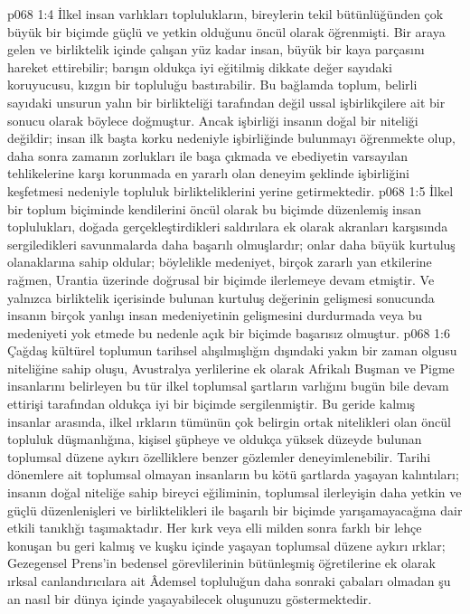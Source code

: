\vs p068 1:4 İlkel insan varlıkları toplulukların, bireylerin tekil bütünlüğünden çok büyük bir biçimde güçlü ve yetkin olduğunu öncül olarak öğrenmişti. Bir araya gelen ve birliktelik içinde çalışan yüz kadar insan, büyük bir kaya parçasını hareket ettirebilir; barışın oldukça iyi eğitilmiş dikkate değer sayıdaki koruyucusu, kızgın bir topluluğu bastırabilir. Bu bağlamda toplum, belirli sayıdaki unsurun yalın bir birlikteliği tarafından değil ussal işbirlikçilere ait  bir sonucu olarak böylece doğmuştur. Ancak işbirliği insanın doğal bir niteliği değildir; insan ilk başta korku nedeniyle işbirliğinde bulunmayı öğrenmekte olup, daha sonra zamanın zorlukları ile başa çıkmada ve ebediyetin varsayılan tehlikelerine karşı korunmada en yararlı olan deneyim şeklinde işbirliğini keşfetmesi nedeniyle topluluk birlikteliklerini yerine getirmektedir.
\vs p068 1:5 İlkel bir toplum biçiminde kendilerini öncül olarak bu biçimde düzenlemiş insan toplulukları, doğada gerçekleştirdikleri saldırılara ek olarak akranları karşısında sergiledikleri savunmalarda daha başarılı olmuşlardır; onlar daha büyük kurtuluş olanaklarına sahip oldular; böylelikle medeniyet, birçok zararlı yan etkilerine rağmen, Urantia üzerinde doğrusal bir biçimde ilerlemeye devam etmiştir. Ve yalnızca birliktelik içerisinde bulunan kurtuluş değerinin gelişmesi sonucunda insanın birçok yanlışı insan medeniyetinin gelişmesini durdurmada veya bu medeniyeti yok etmede bu nedenle açık bir biçimde başarısız olmuştur.
\vs p068 1:6 Çağdaş kültürel toplumun tarihsel alışılmışlığın dışındaki yakın bir zaman olgusu niteliğine sahip oluşu, Avustralya yerlilerine ek olarak Afrikalı Buşman ve Pigme insanlarını belirleyen bu tür ilkel toplumsal şartların varlığını bugün bile devam ettirişi tarafından oldukça iyi bir biçimde sergilenmiştir. Bu geride kalmış insanlar arasında, ilkel ırkların tümünün çok belirgin ortak nitelikleri olan öncül topluluk düşmanlığına, kişisel şüpheye ve oldukça yüksek düzeyde bulunan toplumsal düzene aykırı özelliklere benzer gözlemler deneyimlenebilir. Tarihi dönemlere ait toplumsal olmayan insanların bu kötü şartlarda yaşayan kalıntıları; insanın doğal niteliğe sahip bireyci eğiliminin, toplumsal ilerleyişin daha yetkin ve güçlü düzenlenişleri ve birliktelikleri ile başarılı bir biçimde yarışamayacağına dair etkili tanıklığı taşımaktadır. Her kırk veya elli milden sonra farklı bir lehçe konuşan bu geri kalmış ve kuşku içinde yaşayan toplumsal düzene aykırı ırklar; Gezegensel Prens’in bedensel görevlilerinin bütünleşmiş öğretilerine ek olarak ırksal canlandırıcılara ait Âdemsel topluluğun daha sonraki çabaları olmadan şu an nasıl bir dünya içinde yaşayabilecek oluşunuzu göstermektedir.
